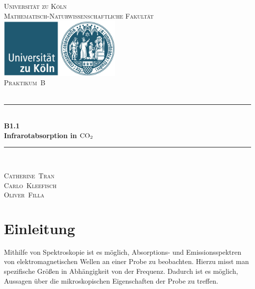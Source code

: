 \documentclass[12pt,a4paper]{scrartcl}
\numberwithin{equation}{section} %
\newcommand{\HRule}{\rule{\linewidth}{0.7mm}}
\renewcommand{\[}{} %
\renewcommand{\]}{\noindent} %
\begin{document}
\begin{titlepage}
	\pagestyle{empty}

	\begin{center}

	\textsc{\LARGE Universität zu Köln }\\ [0.4cm]
	\textsc{Mathematisch-Naturwissenschaftliche Fakultät} \\[1.5cm]

	\includegraphics[width=0.45\textwidth]{../media/uni.jpg}\\[1.5cm]  %

	\textsc{\Large Praktikum~B}\\[2mm]
	\textsc{}\\[10mm]
	\HRule \\[0.4cm]

		{	\Huge \bfseries B1.1}\\[0.4cm]
			{	\huge \bfseries Infrarotabsorption in \(\ce{CO_2}\)}\\[0.3cm]
	
	\HRule \\[3cm]

 	\begin{center}
		\textsc{\Large Catherine~Tran } \\[3pt]
		\textsc{\Large Carlo~Kleefisch } \\[3pt]
		\textsc{\Large Oliver~Filla } \\[3pt]
	\end{center}
	\end{center}
\end{titlepage}

\newpage
\tableofcontents
\newpage

\hypertarget{einleitung}{%
\section{Einleitung}\label{einleitung}}

Mithilfe von Spektroskopie ist es möglich, Absorptions- und
Emissionsspektren von elektromagnetischen Wellen an einer Probe zu
beobachten. Hierzu misst man spezifische Größen in Abhängigkeit von der
Frequenz. Dadurch ist es möglich, Aussagen über die mikroskopischen
Eigenschaften der Probe zu treffen.
\end{document}
